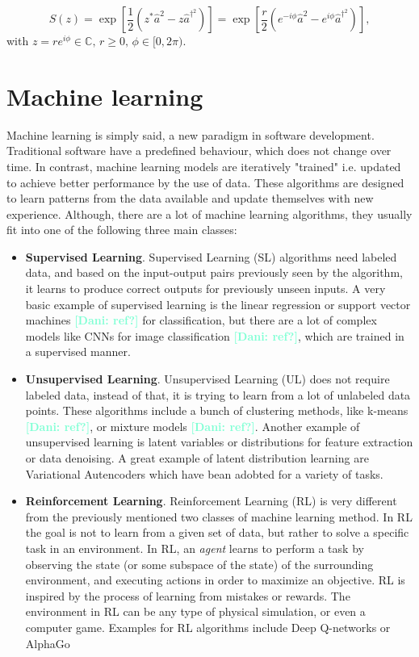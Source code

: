 \documentclass[12pt, a4paper,  nobibnotes]{article}
\newcommand{\op}[1]{\hat{#1}}
\newcommand{\nd}[1]{\textcolor{Aquamarine}{\textbf{[Dani: #1]}}}
\begin{document}
\begin{equation}
     S(z) = \exp\left[ \frac{1}{2}\left( z^*\op a^2 - z \op a^{\dagger^2} \right) \right]
     = \exp\left[ \frac{r}{2}\left( e^{-i\phi}\op a^2 - e^{i\phi} \op a^{\dagger^2} \right) \right],
\end{equation}
with $z = re^{i\phi} \in\mathbb{C},\, r\geq 0,\, \phi\in [0,2\pi)$.

\section{Machine learning}
\label{sec:ml-intro}

Machine learning is simply said, a new paradigm in software development. Traditional software have
a predefined behaviour, which does not change over time. In contrast, machine learning models
are iteratively "trained" i.e. updated to achieve better performance by the use of data. These algorithms
are designed to learn patterns from the data available and update themselves with new experience.
Although, there are a lot of machine learning algorithms, they usually fit into one of the following three 
main classes:
\begin{itemize}
    \item \textbf{Supervised Learning}. Supervised Learning (SL) algorithms need labeled data, and
    based on the input-output pairs previously seen by the algorithm, it learns to produce
    correct outputs for previously unseen inputs. A very basic example of supervised learning 
    is the linear regression or support vector machines \nd{ref?} for classification, but there are a lot of complex models like CNNs for image classification
    \nd{ref?}, which are trained in a supervised manner.  
    \item \textbf{Unsupervised Learning}. Unsupervised Learning (UL) does not require labeled data, instead
    of that, it is trying to learn from a lot of unlabeled data points. These algorithms include a bunch
    of clustering methods, like k-means \nd{ref?}, or mixture models \nd{ref?}. Another example of unsupervised
    learning is latent variables or distributions for feature extraction or data denoising. A great example 
    of latent distribution learning are Variational Autencoders \cite{VAEPaper} which have bean adobted 
    for a variety of tasks.
    \item \textbf{Reinforcement Learning}. Reinforcement Learning (RL) is very different from the previously
    mentioned two classes of machine learning method. In RL the goal is not to learn from a given set of 
    data, but rather to solve a specific task in an environment. In RL, an \textit{agent} learns to 
    perform a task by observing the state (or some subspace of the state) of the surrounding environment,
    and executing actions in order to maximize an objective. RL is inspired by the process of learning from 
    mistakes or rewards. The environment in RL can be any type of physical simulation, or even a computer game.
    Examples for RL algorithms include Deep Q-networks \cite{RLAtariDQN} or AlphaGo \cite{Silver2016AlphaGo}
\end{itemize}
\end{document}
